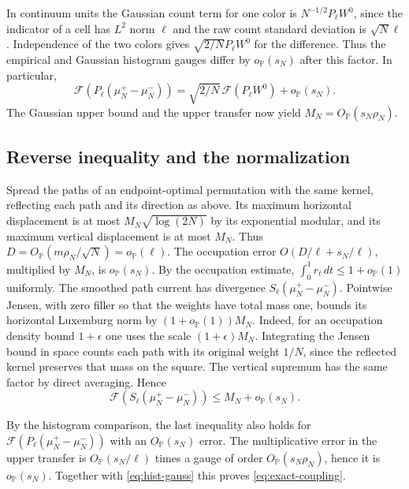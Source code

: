 \documentclass[11pt]{article}
\newcommand{\1}{\mathbf{1}}
\numberwithin{equation}{section}
\begin{document}
In continuum units the Gaussian count term for one color
is \(N^{-1/2}P_\ell W^0\), since the indicator of a cell has
\(L^2\) norm \(\ell\) and the raw count standard deviation is
\(\sqrt N\ell\). Independence of the two colors gives
\(\sqrt{2/N}P_\ell W^0\) for the difference. Thus the empirical
and Gaussian histogram gauges differ by \(o_{\mathbb P}(s_N)\)
after this factor. In particular,
\begin{equation}\label{eq:hist-gauss}
 \mathcal F(P_\ell(\mu_N^+-\mu_N^-))
 =\sqrt{2/N}\,\mathcal F(P_\ell W^0)+o_{\mathbb P}(s_N).
\end{equation}
The Gaussian upper bound and the upper transfer now yield
\(M_N=O_{\mathbb P}(s_N\rho_N)\).


\subsection{Reverse inequality and the normalization}
Spread the paths of an endpoint-optimal permutation with the
same kernel, reflecting each path and its direction as above.
Its maximum horizontal displacement is at most
\(M_N\sqrt{\log(2N)}\) by its exponential modular, and its
maximum vertical displacement is at most \(M_N\).
Thus \(D=O_{\mathbb P}(m\rho_N/\sqrt N)=o_{\mathbb P}(\ell)\).
The occupation error \(O(D/\ell+s_N/\ell)\), multiplied
by \(M_N\), is \(o_{\mathbb P}(s_N)\).
By the occupation estimate,
\(\int_0^1 r_t\,dt\le1+o_{\mathbb P}(1)\) uniformly.
The smoothed path current has divergence
\(S_\ell(\mu_N^+-\mu_N^-)\). Pointwise Jensen, with zero
filler so that the weights have total mass one, bounds its
horizontal Luxemburg norm by \((1+o_{\mathbb P}(1))M_N\).
Indeed, for an occupation density bound \(1+\epsilon\) one
uses the scale \((1+\epsilon)M_N\). Integrating the Jensen
bound in space counts each path with its original weight
\(1/N\), since the reflected kernel preserves that mass on the
square. The vertical supremum has the same factor by direct
averaging. Hence
\[
 \mathcal F(S_\ell(\mu_N^+-\mu_N^-))
               \le M_N+o_{\mathbb P}(s_N) .
\]


By the histogram comparison, the last inequality also holds for
\(\mathcal F(P_\ell(\mu_N^+-\mu_N^-))\) with an \(O_{\mathbb P}(s_N)\)
error. The multiplicative error in the upper transfer is
\(O_{\mathbb P}(s_N/\ell)\) times a gauge of order
\(O_{\mathbb P}(s_N\rho_N)\), hence it is \(o_{\mathbb P}(s_N)\).
Together with \eqref{eq:hist-gauss} this proves \eqref{eq:exact-coupling}.
\end{document}
